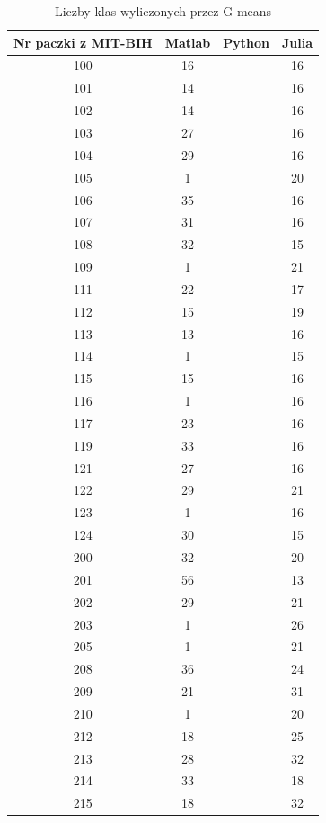 \begin{table}[!tp]
	\centering
	\caption{Liczby klas wyliczonych przez G-means}
	\label{tabResults2}
	\begin{tabular}{|c|c|c|c|}
		\hline
		Nr paczki z MIT-BIH & Matlab & Python & Julia\\ \hline		
		100 & 16 &  & 16\\ \hline
		101 & 14 &  & 16\\ \hline
		102 & 14 &  & 16\\ \hline
		103 & 27 &  & 16\\ \hline
		104 & 29 &  & 16\\ \hline
		105 &  1 &  & 20\\ \hline
		106 & 35 &  & 16\\ \hline
		107 & 31 &  & 16\\ \hline
		108 & 32 &  & 15\\ \hline
		109 &  1 &  & 21\\ \hline
		111 & 22 &  & 17\\ \hline
		112 & 15 &  & 19\\ \hline
		113 & 13 &  & 16\\ \hline
		114 &  1 &  & 15\\ \hline
		115 & 15 &  & 16\\ \hline
		116 &  1 &  & 16\\ \hline
		117 & 23 &  & 16\\ \hline
		119 & 33 &  & 16\\ \hline
		121 & 27 &  & 16\\ \hline
		122 & 29 &  & 21\\ \hline
		123 &  1 &  & 16\\ \hline
		124 & 30 &  & 15\\ \hline
		200 & 32 &  & 20\\ \hline
		201 & 56 &  & 13\\ \hline
		202 & 29 &  & 21\\ \hline
		203 &  1 &  & 26\\ \hline
		205 &  1 &  & 21\\ \hline
		208 & 36 &  & 24\\ \hline
		209 & 21 &  & 31\\ \hline
		210 &  1 &  & 20\\ \hline
		212 & 18 &  & 25\\ \hline
		213 & 28 &  & 32\\ \hline
		214 & 33 &  & 18\\ \hline
		215 & 18 &  & 32\\ \hline

\end{tabular}
\end{table}
